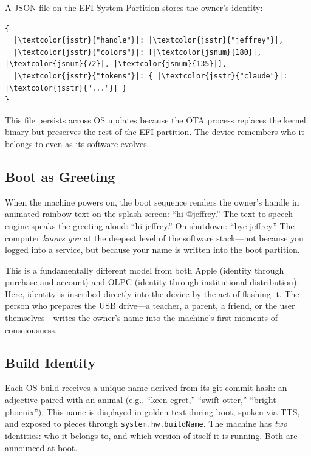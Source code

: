 \documentclass[10pt,letterpaper,twocolumn]{article}
\begin{document}
A JSON file on the EFI System Partition stores the owner's identity:

\begin{lstlisting}[style=acjsstyle]
{
  |\textcolor{jsstr}{"handle"}|: |\textcolor{jsstr}{"jeffrey"}|,
  |\textcolor{jsstr}{"colors"}|: [|\textcolor{jsnum}{180}|, |\textcolor{jsnum}{72}|, |\textcolor{jsnum}{135}|],
  |\textcolor{jsstr}{"tokens"}|: { |\textcolor{jsstr}{"claude"}|: |\textcolor{jsstr}{"..."}| }
}
\end{lstlisting}

This file persists across OS updates because the OTA process replaces the kernel binary but preserves the rest of the EFI partition. The device remembers who it belongs to even as its software evolves.

\subsection{Boot as Greeting}

When the machine powers on, the boot sequence renders the owner's handle in animated rainbow text on the splash screen: ``hi @jeffrey.'' The text-to-speech engine speaks the greeting aloud: ``hi jeffrey.'' On shutdown: ``bye jeffrey.'' The computer \emph{knows you} at the deepest level of the software stack---not because you logged into a service, but because your name is written into the boot partition.

This is a fundamentally different model from both Apple (identity through purchase and account) and OLPC (identity through institutional distribution). Here, identity is inscribed directly into the device by the act of flashing it. The person who prepares the USB drive---a teacher, a parent, a friend, or the user themselves---writes the owner's name into the machine's first moments of consciousness.

\subsection{Build Identity}

Each OS build receives a unique name derived from its git commit hash: an adjective paired with an animal (e.g., ``keen-egret,'' ``swift-otter,'' ``bright-phoenix''). This name is displayed in golden text during boot, spoken via TTS, and exposed to pieces through \texttt{system.hw.buildName}. The machine has \emph{two} identities: who it belongs to, and which version of itself it is running. Both are announced at boot.
\end{document}
